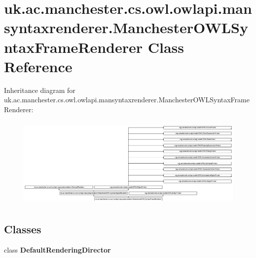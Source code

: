 \hypertarget{classuk_1_1ac_1_1manchester_1_1cs_1_1owl_1_1owlapi_1_1mansyntaxrenderer_1_1_manchester_o_w_l_syntax_frame_renderer}{\section{uk.\-ac.\-manchester.\-cs.\-owl.\-owlapi.\-mansyntaxrenderer.\-Manchester\-O\-W\-L\-Syntax\-Frame\-Renderer Class Reference}
\label{classuk_1_1ac_1_1manchester_1_1cs_1_1owl_1_1owlapi_1_1mansyntaxrenderer_1_1_manchester_o_w_l_syntax_frame_renderer}
}
Inheritance diagram for uk.\-ac.\-manchester.\-cs.\-owl.\-owlapi.\-mansyntaxrenderer.\-Manchester\-O\-W\-L\-Syntax\-Frame\-Renderer\-:\begin{figure}[H]
\begin{center}
\leavevmode
\includegraphics[height=4.493827cm]{classuk_1_1ac_1_1manchester_1_1cs_1_1owl_1_1owlapi_1_1mansyntaxrenderer_1_1_manchester_o_w_l_syntax_frame_renderer}
\end{center}
\end{figure}
\subsection*{Classes}
\begin{DoxyCompactItemize}
\item 
class {\bfseries Default\-Rendering\-Director}
\end{DoxyCompactItemize}

